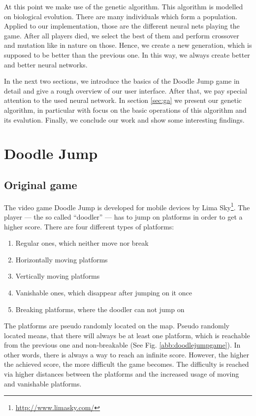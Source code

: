 \documentclass[a4paper,12pt,pagesize,headsepline,bibtotoc,titlepage,abstracton]{scrartcl}
\newcommand{\quot}[1]{{``#1''}}
\begin{document}
At this point we make use of the genetic algorithm. This algorithm is modelled on biological evolution. There are many individuals which form a population. Applied to our implementation, those are the different neural nets playing the game. After all players died, we select the best of them and perform crossover and mutation like in nature on those. Hence, we create a new generation, which is supposed to be better than the previous one. In this way, we always create better and better neural networks.

In the next two sections, we introduce the basics of the Doodle Jump game in detail and give a rough overview of our user interface. After that, we pay special attention to the used neural network. In section \ref{sec:ga} we present our genetic algorithm, in particular with focus on the basic operations of this algorithm and its evalution. Finally, we conclude our work and show some interesting findings.

\section{Doodle Jump}
\subsection{Original game}

The video game Doodle Jump is developed for mobile devices by Lima Sky\footnote{\url{http://www.limasky.com/}}. The player --- the so called \quot{doodler} --- has to jump on platforms in order to get a higher score. There are four different types of platforms:
\begin{enumerate}
    \item Regular ones, which neither move nor break
    \item Horizontally moving platforms
    \item Vertically moving platforms
    \item Vanishable ones, which disappear after jumping on it once
    \item Breaking platforms, where the doodler can not jump on
\end{enumerate}
The platforms are pseudo randomly located on the map. Pseudo randomly located means, that there will always be at least one platform, which is reachable from the previous one and non-breakable (See Fig. \ref{abb:doodlejumpgame}). In other words, there is always a way to reach an infinite score. However, the higher the achieved score, the more difficult the game becomes. The difficulty is reached via higher distances between the platforms and the increased usage of moving and vanishable platforms.
\end{document}
